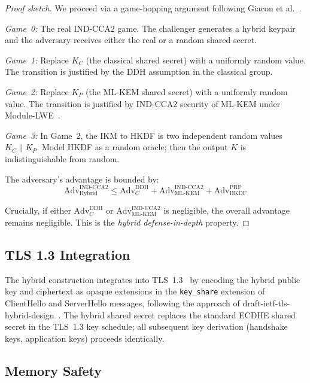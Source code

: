\documentclass[conference,10pt]{IEEEtran}
\begin{document}
\begin{proof}[Proof sketch]
We proceed via a game-hopping argument following Giacon et al.~\cite{giacon2018}.

\emph{Game~0:} The real IND-CCA2 game. The challenger generates a hybrid
keypair and the adversary receives either the real or a random shared
secret.

\emph{Game~1:} Replace $K_C$ (the classical shared secret) with a
uniformly random value. The transition is justified by the DDH
assumption in the classical group.

\emph{Game~2:} Replace $K_P$ (the ML-KEM shared secret) with a uniformly
random value. The transition is justified by IND-CCA2 security of ML-KEM
under Module-LWE~\cite{regev2005, lyubashevsky2010}.

\emph{Game~3:} In Game~2, the IKM to HKDF is two independent random
values $K_C \| K_P$. Model HKDF as a random oracle; then the output $K$
is indistinguishable from random.

The adversary's advantage is bounded by:
\begin{equation}
  \text{Adv}^{\text{IND-CCA2}}_{\text{Hybrid}} \leq \text{Adv}^{\text{DDH}}_C + \text{Adv}^{\text{IND-CCA2}}_{\text{ML-KEM}} + \text{Adv}^{\text{PRF}}_{\text{HKDF}}
\end{equation}

Crucially, if either $\text{Adv}^{\text{DDH}}_C$ or
$\text{Adv}^{\text{IND-CCA2}}_{\text{ML-KEM}}$ is negligible, the
overall advantage remains negligible. This is the \emph{hybrid
defense-in-depth} property.
\end{proof}

\subsection{TLS 1.3 Integration}

The hybrid construction integrates into TLS~1.3~\cite{rfc8446} by
encoding the hybrid public key and ciphertext as opaque extensions in the
\texttt{key\_share} extension of ClientHello and ServerHello messages,
following the approach of draft-ietf-tls-hybrid-design~\cite{draft-hybrid-design}.
The hybrid shared secret replaces the standard ECDHE shared secret in the
TLS~1.3 key schedule; all subsequent key derivation (handshake keys,
application keys) proceeds identically.

\subsection{Memory Safety}
\end{document}
